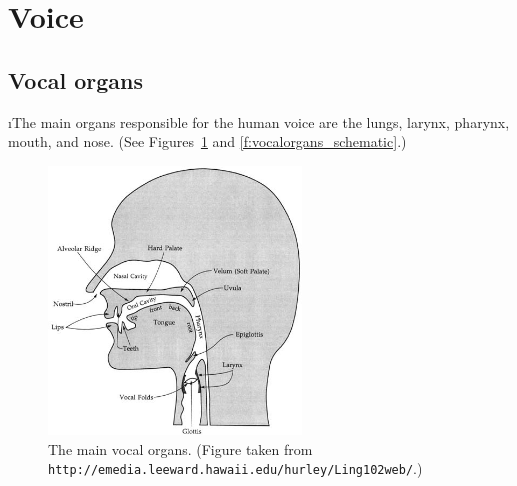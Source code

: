 \section{Voice}

\subsection{Vocal organs}
\bi

\i The main organs responsible for the human voice 
are the lungs, larynx, pharynx, mouth, and nose.
(See Figures~\ref{f:vocalorgans} and \ref{f:vocalorgans_schematic}.)
%
\begin{figure}[htbp]
\begin{center}
\includegraphics[width=0.6\textwidth]{vocalorgans}
\caption{
The main vocal organs.
(Figure taken from 
{\tt http://emedia.leeward.hawaii.edu/hurley/Ling102web/}.)}
\label{f:vocalorgans}
\end{center}
\end{figure}
%
%
